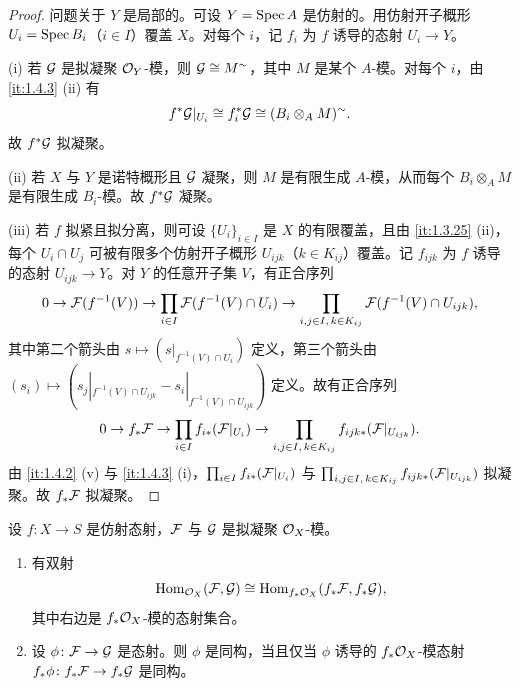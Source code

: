 \begin{proof}
问题关于 $Y$ 是局部的。可设 $Y=\operatorname{Spec} A$ 是仿射的。用仿射开子概形 $U_i=\operatorname{Spec} B_i$（$i\in I$）覆盖 $X$。对每个 $i$，记 $f_i$ 为 $f$ 诱导的态射 $U_i\to Y$。

(i) 若 $\mathcal{G}$ 是拟凝聚 $\mathcal{O}_Y$-模，则 $\mathcal{G}\cong M^\sim$，其中 $M$ 是某个 $A$-模。对每个 $i$，由 \ref{it:1.4.3} (ii) 有
\[
f^*\mathcal{G}|_{U_i}\cong f_i^*\mathcal{G}\cong(B_i\otimes_A M)^\sim.
\]
故 $f^*\mathcal{G}$ 拟凝聚。

(ii) 若 $X$ 与 $Y$ 是诺特概形且 $\mathcal{G}$ 凝聚，则 $M$ 是有限生成 $A$-模，从而每个 $B_i\otimes_A M$ 是有限生成 $B_i$-模。故 $f^*\mathcal{G}$ 凝聚。

(iii) 若 $f$ 拟紧且拟分离，则可设 $\{U_i\}_{i\in I}$ 是 $X$ 的有限覆盖，且由 \ref{it:1.3.25} (ii)，每个 $U_i\cap U_j$ 可被有限多个仿射开子概形 $U_{ijk}$（$k\in K_{ij}$）覆盖。记 $f_{ijk}$ 为 $f$ 诱导的态射 $U_{ijk}\to Y$。对 $Y$ 的任意开子集 $V$，有正合序列
\[
0\to\mathcal{F}(f^{-1}(V))\to\prod_{i\in I}\mathcal{F}(f^{-1}(V)\cap U_i)\to\prod_{i,j\in I,\,k\in K_{ij}}\mathcal{F}(f^{-1}(V)\cap U_{ijk}),
\]
其中第二个箭头由 $s\mapsto(s|_{f^{-1}(V)\cap U_i})$ 定义，第三个箭头由 $(s_i)\mapsto(s_j|_{f^{-1}(V)\cap U_{ijk}}-s_i|_{f^{-1}(V)\cap U_{ijk}})$ 定义。故有正合序列
\[
0\to f_*\mathcal{F}\to\prod_{i\in I}f_{i*}(\mathcal{F}|_{U_i})\to\prod_{i,j\in I,\,k\in K_{ij}}f_{ijk*}(\mathcal{F}|_{U_{ijk}}).
\]
由 \ref{it:1.4.2} (v) 与 \ref{it:1.4.3} (i)，$\prod_{i\in I}f_{i*}(\mathcal{F}|_{U_i})$ 与 $\prod_{i,j\in I,\,k\in K_{ij}}f_{ijk*}(\mathcal{F}|_{U_{ijk}})$ 拟凝聚。故 $f_*\mathcal{F}$ 拟凝聚。
\end{proof}

\begin{proposition}\label{it:1.4.10}
设 $f\colon X\to S$ 是仿射态射，$\mathcal{F}$ 与 $\mathcal{G}$ 是拟凝聚 $\mathcal{O}_X$-模。
\begin{enumerate}[label=(\roman*),leftmargin=2.8em]
  \item 有双射
  \[
  \operatorname{Hom}_{\mathcal{O}_X}(\mathcal{F},\mathcal{G})\cong\operatorname{Hom}_{f_*\mathcal{O}_X}(f_*\mathcal{F},f_*\mathcal{G}),
  \]
  其中右边是 $f_*\mathcal{O}_X$-模的态射集合。
  \item 设 $\phi\colon\mathcal{F}\to\mathcal{G}$ 是态射。则 $\phi$ 是同构，当且仅当 $\phi$ 诱导的 $f_*\mathcal{O}_X$-模态射 $f_*\phi\colon f_*\mathcal{F}\to f_*\mathcal{G}$ 是同构。
\end{enumerate}
\end{proposition}

